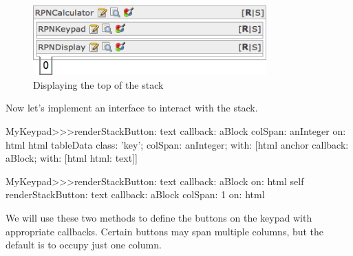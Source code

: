 \documentclass[a4paper,10pt,twoside]{book}
\begin{document}
\begin{figure}[ht]
\begin{center}
\includegraphics[width=0.8\textwidth]{firstStackDisplay}
\caption{Displaying the top of the stack}
\end{center}
\end{figure}

Now let's implement an interface to interact with the stack.


\begin{code}{}
MyKeypad>>>renderStackButton: text callback: aBlock colSpan: anInteger on: html 
	html tableData
		class: 'key';
		colSpan: anInteger;
		with: 
				[html anchor
					callback: aBlock;
					with: [html html: text]]
\end{code}


\begin{code}{}
MyKeypad>>>renderStackButton: text callback: aBlock on: html 
	self 
		renderStackButton: text
		callback: aBlock
		colSpan: 1
		on: html
\end{code}

We will use these two methods to define the buttons on the keypad with appropriate callbacks.
Certain buttons may span multiple columns, but the default is to occupy just one column.

\end{document}
